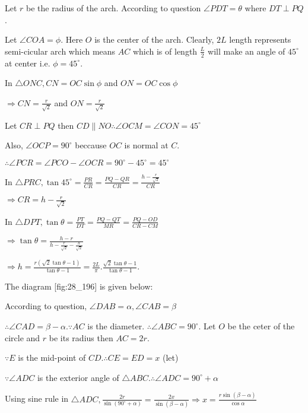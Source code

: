   Let $r$ be the radius of the arch. According to question $\angle PDT = \theta$ where
  $DT\perp PQ$.

  Let $\angle COA = \phi$. Here $O$ is the center of the arch. Clearly, $2L$ length
  represents semi-cicular arch which means $AC$ which is of length $\frac{L}{2}$ will make an
  angle of $45^\circ$ at center i.e. $\phi = 45^\circ$.

  In $\triangle ONC, CN = OC\sin\phi$ and $ON = OC\cos\phi$

  $\Rightarrow CN = \frac{r}{\sqrt{2}}$ and $ON = \frac{r}{\sqrt{2}}$

  Let $CR\perp PQ$ then $CD\parallel NO \therefore \angle OCM = \angle CON = 45^\circ$

  Also, $\angle OCP = 90^\circ$ beccause $OC$ is normal at $C$.

  $\therefore \angle PCR = \angle PCO - \angle OCR = 90^\circ - 45^\circ = 45^\circ$

  In $\triangle PRC, \tan45^\circ = \frac{PR}{CR} = \frac{PQ - QR}{CR} = \frac{h -
    \frac{r}{\sqrt{2}}}{CR}$

  $\Rightarrow CR = h - \frac{r}{\sqrt{2}}$

  In $\triangle DPT, \tan\theta = \frac{PT}{DT} = \frac{PQ - QT}{MR} = \frac{PQ - OD}{CR - CM}$

  $\Rightarrow \tan\theta = \frac{h - r}{h- \frac{r}{\sqrt{2}} - \frac{h}{\sqrt{2}}}$

  $\Rightarrow h = \frac{r(\sqrt{2}\tan\theta - 1)}{\tan\theta - 1} =
  \frac{2L}{\pi}.\frac{\sqrt{2}\tan\theta - 1}{\tan\theta - 1}$.

\item The diagram [fig:28_196] is given below:

  \startplacefigure[reference=fig:28_196]
    \externalfigure[28_196.pdf]
  \stopplacefigure

  According to question, $\angle DAB = \alpha, \angle CAB = \beta$

  $\therefore \angle CAD = \beta - \alpha.\because AC$ is the diameter. $\therefore \angle
  ABC = 90^\circ$. Let $O$ be the ceter of the circle and $r$ be its radius then $AC =
  2r$.

  $\because E$ is the mid-point of $CD. \therefore CE = ED = x$ (let)

  $\because \angle ADC$ is the exterior angle of $\triangle ABC. \therefore \angle ADC =
  90^\circ + \alpha$

  Using sine rule in $\triangle ADC, \frac{2r}{\sin(90^\circ + \alpha)} = \frac{2x}{\sin(\beta -
    \alpha)} \Rightarrow x = \frac{r\sin(\beta - \alpha)}{\cos\alpha}$

